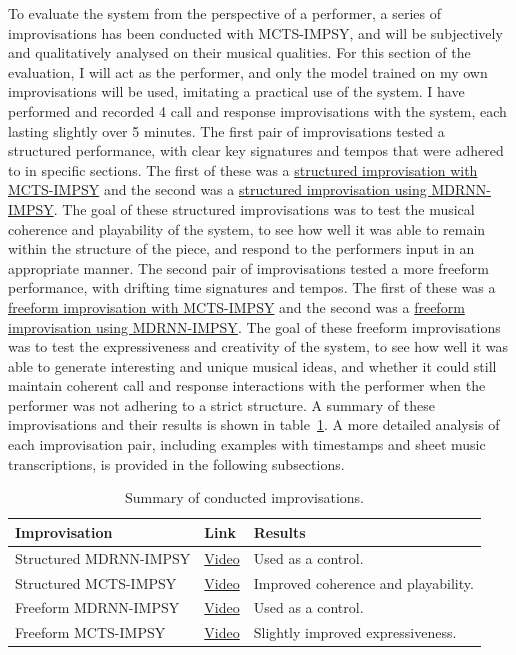 To evaluate the system from the perspective of a performer, a series of improvisations has been conducted with MCTS-IMPSY, and will be subjectively and qualitatively analysed on their musical qualities. For this section of the evaluation, I will act as the performer, and only the model trained on my own improvisations will be used, imitating a practical use of the system. I have performed and recorded 4 call and response improvisations with the system, each lasting slightly over 5 minutes. The first pair of improvisations tested a structured performance, with clear key signatures and tempos that were adhered to in specific sections. The first of these was a \href{https://youtu.be/0DQhZ1FaKT4}{structured improvisation with MCTS-IMPSY} and the second was a \href{https://youtu.be/6BZlfXHocU8}{structured improvisation using MDRNN-IMPSY}. The goal of these structured improvisations was to test the musical coherence and playability of the system, to see how well it was able to remain within the structure of the piece, and respond to the performers input in an appropriate manner. The second pair of improvisations tested a more freeform performance, with drifting time signatures and tempos. The first of these was a \href{https://youtu.be/2op_NtcvT8M}{freeform improvisation with MCTS-IMPSY} and the second was a \href{https://youtu.be/8ncMNEG4Ang}{freeform improvisation using MDRNN-IMPSY}. The goal of these freeform improvisations was to test the expressiveness and creativity of the system, to see how well it was able to generate interesting and unique musical ideas, and whether it could still maintain coherent call and response interactions with the performer when the performer was not adhering to a strict structure. A summary of these improvisations and their results is shown in table~\ref{tab:improv_summary}. A more detailed analysis of each improvisation pair, including examples with timestamps and sheet music transcriptions, is provided in the following subsections.

\begin{table}[th!]
    \centering
    \begin{tabular}{|l|l|l|}
        \hline
        \textbf{Improvisation} & \textbf{Link} & \textbf{Results} \\ \hline
        Structured MDRNN-IMPSY & \href{https://youtu.be/6BZlfXHocU8}{Video} & Used as a control. \\ \hline
        Structured MCTS-IMPSY & \href{https://youtu.be/0DQhZ1FaKT4}{Video} & Improved coherence and playability. \\ \hline
        Freeform MDRNN-IMPSY & \href{https://youtu.be/8ncMNEG4Ang}{Video} & Used as a control. \\ \hline
        Freeform MCTS-IMPSY & \href{https://youtu.be/2op_NtcvT8M}{Video} & Slightly improved expressiveness. \\ \hline
    \end{tabular}
    \caption{Summary of conducted improvisations.\label{tab:improv_summary}}
\end{table}

